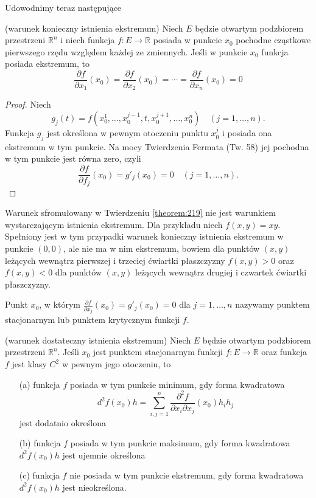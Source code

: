 \documentclass[leqno]{article}
\begin{document}
\begin{justify}
Udowodnimy teraz następujące 

\begin{theorem}
{
    (warunek konieczny istnienia ekstremum) Niech $E$ będzie otwartym podzbiorem przestrzeni $\mathbb{R}^n$ i
    niech funkcja $f : E \to \mathbb{R}$ posiada w punkcie $x_0$ pochodne cząstkowe pierwszego rzędu względem każdej ze zmiennych. Jeśli w punkcie $x_0$ funkcja
    posiada ekstremum, to 
    \[
        \frac{\partial f}{\partial x_1}(x_0) = \frac{\partial f}{\partial x_2}(x_0) = \cdots = \frac{\partial f}{\partial x_n}(x_0) = 0
    \]
}
\end{theorem}

\begin{proof}
    Niech 
    \[
        g_j(t) = f(x_0^1, \ldots, x_0^{j-1}, t, x_0^{j+1}, \ldots, x_0^n) \quad (j = 1, \ldots, n).
    \]
    Funkcja $g_j$ jest określona w pewnym otoczeniu punktu $x_0^j$ i posiada ona ekstremum w tym punkcie. Na mocy Twierdzenia Fermata (Tw. 58) jej pochodna w tym
    punkcie jest równa zero, czyli 
    \[
        \frac{\partial f}{\partial f_j}(x_0) = g'_j(x_0) = 0 \quad (j = 1, \ldots, n).
    \]
\end{proof}

\begin{uwaga}
    Warunek sfromułowany w Twierdzeniu \ref{theorem:219} nie jest warunkiem wystarczającym istnienia ekstremum. Dla przykładu niech $f(x,y) = xy$. Spełniony jest
    w tym przypadki warunek konieczny istnienia ekstremum w punkcie $(0,0)$, ale nie ma w nim ekstremum, bowiem dla punktów $(x,y)$ leżących wewnątrz pierwszej i trzeciej ćwiartki
    płaszczyzny $f(x,y) > 0$ oraz $f(x,y) < 0$ dla punktów $(x,y)$ leżących wewnątrz drugiej i czwartek ćwiartki płaszczyzny. 
\end{uwaga}

\begin{defn}
    Punkt $x_0$, w którym $\frac{\partial f}{\partial x_j}(x_0) = g'_j(x_0) = 0$ dla $j = 1, \ldots, n$ nazywamy punktem stacjonarnym lub
    punktem krytycznym funkcji $f$.
\end{defn}

\begin{theorem}
{
    (warunek dostateczny istnienia ekstremum) Niech $E$ będzie otwartym podzbiorem przestrzeni $\mathbb{R}^n$. Jeśli $x_0$ jest
    punktem stacjonarnym funkcji $f : E \to \mathbb{R}$ oraz funkcja $f$ jest klasy $C^2$ w pewnym jego otoczeniu, to
    \begin{itemize}
        \item [(a)] funkcja $f$ posiada w tym punkcie minimum, gdy forma kwadratowa 
            \[
                d^2 f(x_0)h = \sum_{i,j=1}^{n}\frac{\partial ^2 f}{\partial x_i \partial x_j}(x_0)h_i h_j
            \]
            jest dodatnio określona
        \item [(b)]
            funkcja $f$ posiada w tym punkcie maksimum, gdy forma kwadratowa $d^2 f(x_0)h$ jest ujemnie określona
        \item [(c)]
            funkcja $f$ nie posiada w tym punkcie ekstremum, gdy forma kwadratowa $d^2 f(x_0)h$ jest nieokreślona.
    \end{itemize}
}
\end{theorem}


\end{justify}
\end{document}
